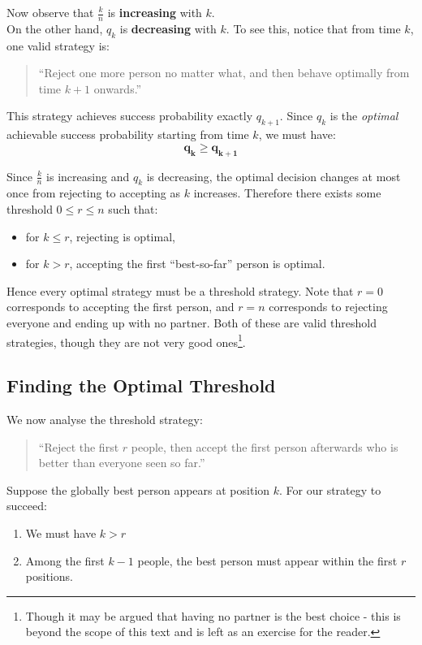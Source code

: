 \documentclass[11pt,openany]{book}
\begin{document}
\noindent Now observe that \(\frac{k}{n}\) is \textbf{increasing} with \(k\). \\

\noindent On the other hand, \(q_k\) is \textbf{decreasing} with \(k\). To see this, notice that from time \(k\), one valid strategy is:
\begin{quote}
``Reject one more person no matter what, and then behave optimally from time \(k+1\) onwards.''
\end{quote}

This strategy achieves success probability exactly \(q_{k+1}\). Since \(q_k\) is the \emph{optimal} achievable success probability starting from time \(k\), we must have:
\[
\mathbf{q_k \ge q_{k+1}}
\]

Since \(\frac{k}{n}\) is increasing and \(q_k\) is decreasing, the optimal decision changes at most once from rejecting to accepting as \(k\) increases.
Therefore there exists some threshold \(0 \le r \le n\) such that:
\begin{itemize}
    \item for \(k \le r\), rejecting is optimal,
    \item for \(k > r\), accepting the first ``best-so-far'' person is optimal.
\end{itemize}

\noindent Hence every optimal strategy must be a threshold strategy.
Note that $r=0$ corresponds to accepting the first person, and $r=n$ corresponds to rejecting everyone and ending up with no partner. 
Both of these are valid threshold strategies, though they are not very good ones\footnote{Though it may be argued that having no partner is the best choice - 
this is beyond the scope of this text and is left as an exercise for the reader.}.

\subsection*{Finding the Optimal Threshold}

We now analyse the threshold strategy:
\begin{quote}
``Reject the first \(r\) people, then accept the first person afterwards who is better than everyone seen so far.''
\end{quote}

\noindent Suppose the globally best person appears at position \(k\). For our strategy to succeed:
\begin{enumerate}
    \item We must have \(k > r\)
    \item Among the first \(k-1\) people, the best person must appear within the first \(r\) positions.
\end{enumerate}
\end{document}

